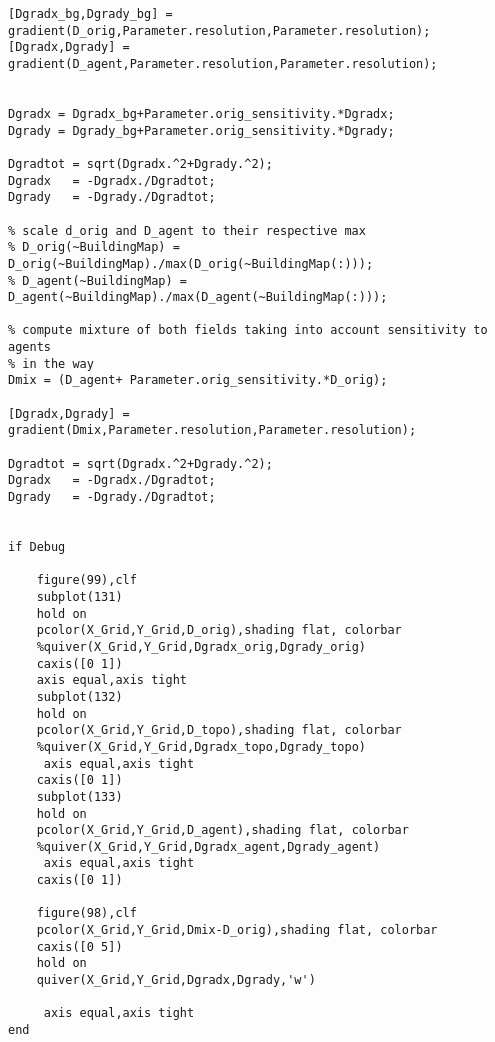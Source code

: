 \begin{lstlisting}[breaklines]
% compute gradients of both fields and add the directions
[Dgradx_bg,Dgrady_bg] = gradient(D_orig,Parameter.resolution,Parameter.resolution);
[Dgradx,Dgrady] = gradient(D_agent,Parameter.resolution,Parameter.resolution);


Dgradx = Dgradx_bg+Parameter.orig_sensitivity.*Dgradx;
Dgrady = Dgrady_bg+Parameter.orig_sensitivity.*Dgrady;

Dgradtot = sqrt(Dgradx.^2+Dgrady.^2);
Dgradx   = -Dgradx./Dgradtot;
Dgrady   = -Dgrady./Dgradtot;

% scale d_orig and D_agent to their respective max
% D_orig(~BuildingMap) = D_orig(~BuildingMap)./max(D_orig(~BuildingMap(:)));
% D_agent(~BuildingMap) = D_agent(~BuildingMap)./max(D_agent(~BuildingMap(:)));

% compute mixture of both fields taking into account sensitivity to agents
% in the way
Dmix = (D_agent+ Parameter.orig_sensitivity.*D_orig);

[Dgradx,Dgrady] = gradient(Dmix,Parameter.resolution,Parameter.resolution);

Dgradtot = sqrt(Dgradx.^2+Dgrady.^2);
Dgradx   = -Dgradx./Dgradtot;
Dgrady   = -Dgrady./Dgradtot;


if Debug

    figure(99),clf
    subplot(131)
    hold on
    pcolor(X_Grid,Y_Grid,D_orig),shading flat, colorbar
    %quiver(X_Grid,Y_Grid,Dgradx_orig,Dgrady_orig)
    caxis([0 1])
    axis equal,axis tight
    subplot(132)
    hold on
    pcolor(X_Grid,Y_Grid,D_topo),shading flat, colorbar
    %quiver(X_Grid,Y_Grid,Dgradx_topo,Dgrady_topo)
     axis equal,axis tight
    caxis([0 1])
    subplot(133)
    hold on
    pcolor(X_Grid,Y_Grid,D_agent),shading flat, colorbar
    %quiver(X_Grid,Y_Grid,Dgradx_agent,Dgrady_agent)
     axis equal,axis tight
    caxis([0 1])

    figure(98),clf
    pcolor(X_Grid,Y_Grid,Dmix-D_orig),shading flat, colorbar
    caxis([0 5])
    hold on
    quiver(X_Grid,Y_Grid,Dgradx,Dgrady,'w')

     axis equal,axis tight
end
\end{lstlisting}
    
